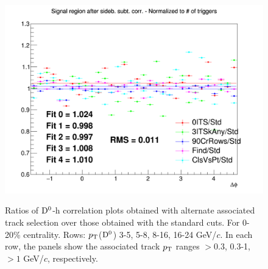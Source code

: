 \begin{figure}
{\includegraphics[width=0.31\linewidth]{figuresVsCent/Dzero/SystTrackEff/0_20/Ratio_AzimCorrDistr_Dzero_Canvas_PtIntBins12to12_PoolInt_thr1to99.png}} \\
 \caption{Ratios of ${\rm D^0}$-h correlation plots obtained with alternate associated track selection over those obtained with the standard cuts. For 0-20\% centrality. Rows: $p_{\rm T}$(${\rm D^0}$) 3-5, 5-8, 8-16, 16-24 GeV/$c$. In each row, the panels show the associated track
$p_{\rm T}$ ranges $> 0.3$, 0.3-1, $> 1$ GeV/$c$, respectively.}
\label{fig:SysTrEff020}
\end{figure}



